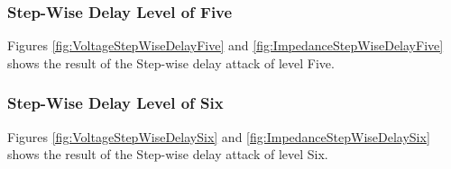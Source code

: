 \subsubsection{Step-Wise Delay Level of Five}
Figures \ref{fig:VoltageStepWiseDelayFive} and \ref{fig:ImpedanceStepWiseDelayFive} shows the result of the Step-wise delay attack of level Five.

\subsubsection{Step-Wise Delay Level of Six}
Figures \ref{fig:VoltageStepWiseDelaySix} and \ref{fig:ImpedanceStepWiseDelaySix} shows the result of the Step-wise delay attack of level Six.



